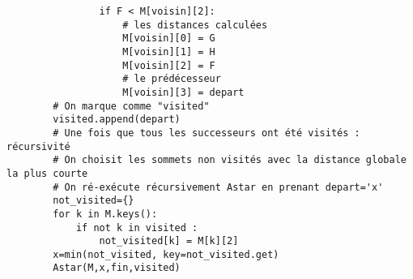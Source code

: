 \begin{lstlisting}
                if F < M[voisin][2]:
                    # les distances calculées
                    M[voisin][0] = G
                    M[voisin][1] = H
                    M[voisin][2] = F
                    # le prédécesseur
                    M[voisin][3] = depart
        # On marque comme "visited"
        visited.append(depart)
        # Une fois que tous les successeurs ont été visités : récursivité
        # On choisit les sommets non visités avec la distance globale la plus courte
        # On ré-exécute récursivement Astar en prenant depart='x'
        not_visited={}
        for k in M.keys():
            if not k in visited :
                not_visited[k] = M[k][2]
        x=min(not_visited, key=not_visited.get)
        Astar(M,x,fin,visited)


\end{lstlisting}



